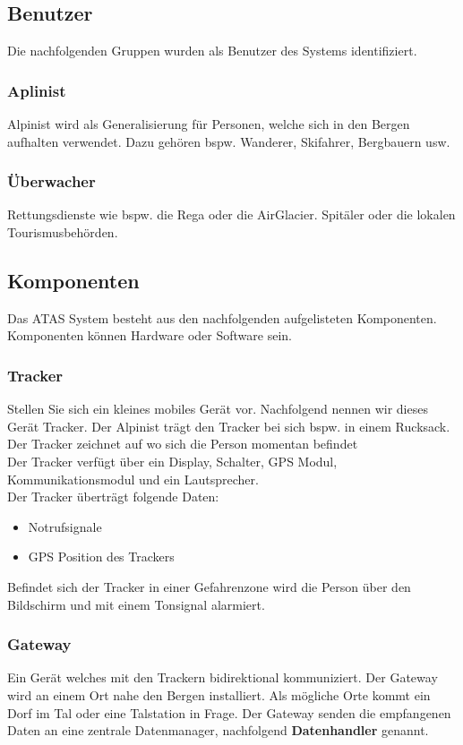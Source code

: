\documentclass[11pt,english,german]{report}
\theoremstyle{definition}
\begin{document}
\newpage
\subsection{Benutzer}
Die nachfolgenden Gruppen wurden als Benutzer des Systems identifiziert.

\subsubsection{Aplinist}
Alpinist wird als Generalisierung für Personen, welche sich in den Bergen aufhalten verwendet. Dazu gehören bspw. Wanderer, Skifahrer, Bergbauern usw.

\subsubsection{Überwacher}
Rettungsdienste wie bspw. die Rega oder die AirGlacier. Spitäler oder die lokalen Tourismusbehörden.

\subsection{Komponenten}
Das ATAS System besteht aus den nachfolgenden aufgelisteten Komponenten. Komponenten können Hardware oder Software sein.

\subsubsection{Tracker}
Stellen Sie sich ein kleines mobiles Gerät vor. Nachfolgend nennen wir dieses Gerät Tracker. Der Alpinist trägt den Tracker bei sich bspw. in einem Rucksack. Der Tracker zeichnet auf wo sich die Person momentan befindet\\ [0.3cm] 
Der Tracker verfügt über ein Display, Schalter, GPS Modul, Kommunikationsmodul und ein Lautsprecher.\\ [0.3cm]
Der Tracker überträgt folgende Daten:
\begin{itemize}
	\item Notrufsignale
	\item GPS Position des Trackers
\end{itemize}
Befindet sich der Tracker in einer Gefahrenzone wird die Person über den Bildschirm und mit einem Tonsignal alarmiert.
\subsubsection{Gateway}
Ein Gerät welches mit den Trackern bidirektional kommuniziert. Der Gateway wird an einem Ort nahe den Bergen installiert. Als mögliche Orte kommt ein Dorf im Tal oder eine Talstation in Frage. Der Gateway senden die empfangenen Daten an eine zentrale Datenmanager, nachfolgend \textbf{Datenhandler} genannt.
\end{document}
